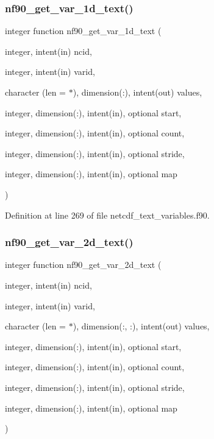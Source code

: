 \subsubsection{\texorpdfstring{nf90\+\_\+get\+\_\+var\+\_\+1d\+\_\+text()}{nf90\_get\_var\_1d\_text()}}
{\footnotesize\ttfamily integer function nf90\+\_\+get\+\_\+var\+\_\+1d\+\_\+text (\begin{DoxyParamCaption}\item[{integer, intent(in)}]{ncid,  }\item[{integer, intent(in)}]{varid,  }\item[{character (len = $\ast$), dimension(\+:), intent(out)}]{values,  }\item[{integer, dimension(\+:), intent(in), optional}]{start,  }\item[{integer, dimension(\+:), intent(in), optional}]{count,  }\item[{integer, dimension(\+:), intent(in), optional}]{stride,  }\item[{integer, dimension(\+:), intent(in), optional}]{map }\end{DoxyParamCaption})}



Definition at line 269 of file netcdf\+\_\+text\+\_\+variables.\+f90.

\mbox{\label{netcdf__text__variables_8f90_a89e4c64b6b65d29cfa998387d381452c}} 
\subsubsection{\texorpdfstring{nf90\+\_\+get\+\_\+var\+\_\+2d\+\_\+text()}{nf90\_get\_var\_2d\_text()}}
{\footnotesize\ttfamily integer function nf90\+\_\+get\+\_\+var\+\_\+2d\+\_\+text (\begin{DoxyParamCaption}\item[{integer, intent(in)}]{ncid,  }\item[{integer, intent(in)}]{varid,  }\item[{character (len = $\ast$), dimension(\+:, \+:), intent(out)}]{values,  }\item[{integer, dimension(\+:), intent(in), optional}]{start,  }\item[{integer, dimension(\+:), intent(in), optional}]{count,  }\item[{integer, dimension(\+:), intent(in), optional}]{stride,  }\item[{integer, dimension(\+:), intent(in), optional}]{map }\end{DoxyParamCaption})}



